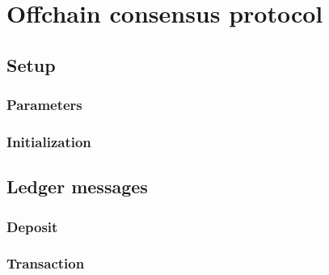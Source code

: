 \documentclass[../hydrozoa.tex]{subfiles}
\begin{document}
\chapter{Offchain consensus protocol}%
\label{h:offchain-consensus-protocol}

\section{Setup}%
\label{h:consensus-setup}

\subsection{Parameters}%
\label{h:consensus-parameters}




\subsection{Initialization}%
\label{h:consensus-intitialization}



\section{Ledger messages}%
\label{h:consensus-ledger}

\subsection{Deposit}%
\label{h:consensus-deposit}



\subsection{Transaction}%
\label{h:consensus-transaction}
\end{document}
